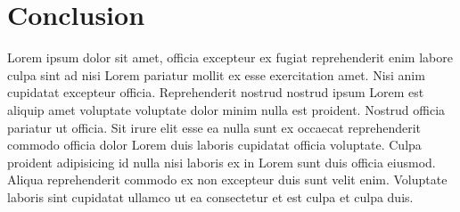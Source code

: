\chapter{Conclusion}
\label{ch:conclusion}


Lorem ipsum dolor sit amet, officia excepteur ex fugiat reprehenderit enim
labore culpa sint ad nisi Lorem pariatur mollit ex esse exercitation amet. Nisi
anim cupidatat excepteur officia. Reprehenderit nostrud nostrud ipsum Lorem est
aliquip amet voluptate voluptate dolor minim nulla est proident. Nostrud
officia pariatur ut officia. Sit irure elit esse ea nulla sunt ex occaecat
reprehenderit commodo officia dolor Lorem duis laboris cupidatat officia
voluptate. Culpa proident adipisicing id nulla nisi laboris ex in Lorem sunt
duis officia eiusmod. Aliqua reprehenderit commodo ex non excepteur duis sunt
velit enim. Voluptate laboris sint cupidatat ullamco ut ea consectetur et est
culpa et culpa duis.
